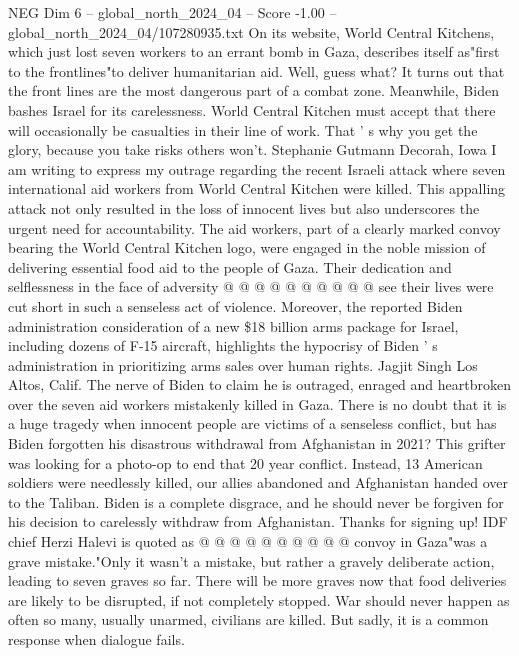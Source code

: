 \begin{textsample}{NEG Dim 6 – global\_north\_2024\_04 – Score -1.00 – global\_north\_2024\_04/107280935.txt}  \label{ex:f6_neg_344}
On its website, World Central Kitchens, which just lost seven workers to an errant bomb in Gaza, describes itself as"first to the frontlines"to deliver humanitarian aid.
Well, guess what?
It turns out that the front lines are the most dangerous part of a combat zone.
Meanwhile, Biden bashes Israel for its carelessness.
World Central Kitchen must accept that there will occasionally be casualties in their line of work.
That ' s why you get the glory, because you take risks others won't.
Stephanie Gutmann Decorah, Iowa I am writing to express my outrage regarding the recent Israeli attack where seven international aid workers from World Central Kitchen were killed.
This appalling attack not only resulted in the loss of innocent lives but also underscores the urgent need for accountability.
The aid workers, part of a clearly marked convoy bearing the World Central Kitchen logo, were engaged in the noble mission of delivering essential food aid to the people of Gaza.
Their dedication and selflessness in the face of adversity @ @ @ @ @ @ @ @ @ @ see their lives were cut short in such a senseless act of violence.
Moreover, the reported Biden administration consideration of a new \$18 billion arms package for Israel, including dozens of F-15 aircraft, highlights the hypocrisy of Biden ' s administration in prioritizing arms sales over human rights.
Jagjit Singh Los Altos, Calif.
The nerve of Biden to claim he is outraged, enraged and heartbroken over the seven aid workers mistakenly killed in Gaza.
There is no doubt that it is a huge tragedy when innocent people are victims of a senseless conflict, but has Biden forgotten his disastrous withdrawal from Afghanistan in 2021?
This grifter was looking for a photo-op to end that 20 year conflict.
Instead, 13 American soldiers were needlessly killed, our allies abandoned and Afghanistan handed over to the Taliban.
Biden is a complete disgrace, and he should never be forgiven for his decision to carelessly withdraw from Afghanistan.
Thanks for signing up!
IDF chief Herzi Halevi is quoted as @ @ @ @ @ @ @ @ @ @ convoy in Gaza"was a grave mistake."Only it wasn't a mistake, but rather a gravely deliberate action, leading to seven graves so far.
There will be more graves now that food deliveries are likely to be disrupted, if not completely stopped.
War should never happen as often so many, usually unarmed, civilians are killed.
But sadly, it is a common response when dialogue fails.

\end{textsample}
